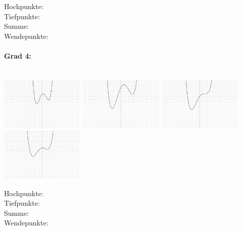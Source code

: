 \documentclass[12pt, parskip=half, a4paper, oneside]{scrartcl}
\begin{document}
\begin{addmargin}[-2cm]{0pt}
Hochpunkte: \\
Tiefpunkte: \\
Summe: \\
Wendepunkte:
\end{addmargin}

\newpage

\paragraph{Grad 4:}\textcolor{white}{.}\\
\includegraphics[width=4cm]{Bilder/G41}\hfill
\includegraphics[width=4cm]{Bilder/G42}\hfill
\includegraphics[width=4cm]{Bilder/G43}\hfill
\includegraphics[width=4cm]{Bilder/G44}

\begin{addmargin}[-2cm]{0pt}
Hochpunkte: \\
Tiefpunkte: \\
Summe: \\
Wendepunkte:
\end{addmargin}
\end{document}
